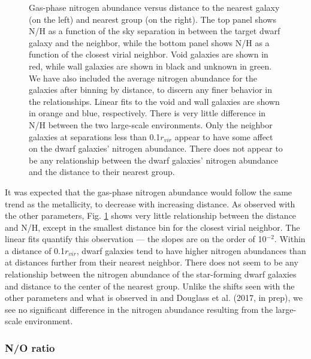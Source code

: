 \begin{figure}
    \caption[N/H versus distance to nearest neighbor and group]{Gas-phase 
    nitrogen abundance versus distance to the nearest galaxy (on the left) and 
    nearest group (on the right).  The top panel shows N/H as a function of the 
    sky separation in \hMpc between the target dwarf galaxy and the neighbor, 
    while the bottom panel shows N/H as a function of the closest virial 
    neighbor.  Void galaxies are shown in red, while wall galaxies are shown in 
    black and unknown in green.  We have also included the average nitrogen 
    abundance for the galaxies after binning by distance, to discern any finer 
    behavior in the relationships.  Linear fits to the void and wall galaxies 
    are shown in orange and blue, respectively.  There is very little difference 
    in N/H between the two large-scale environments.  Only the neighbor galaxies 
    at separations less than 0.1$r_{vir}$ appear to have some affect on the 
    dwarf galaxies' nitrogen abundance.  There does not appear to be any 
    relationship between the dwarf galaxies' nitrogen abundance and the distance 
    to their nearest group.}
    \label{fig:NH}
\end{figure}

It was expected that the gas-phase nitrogen abundance would follow the same 
trend as the metallicity, to decrease with increasing distance.  As observed 
with the other parameters, Fig. \ref{fig:NH} shows very little relationship 
between the distance and N/H, except in the smallest distance bin for the 
closest virial neighbor.  The linear fits quantify this observation --- the 
slopes are on the order of 10$^{-2}$.  Within a distance of 0.1$r_{vir}$, dwarf 
galaxies tend to have higher nitrogen abundances than at distances further from 
their nearest neighbor.  There does not seem to be any relationship between the 
nitrogen abundance of the star-forming dwarf galaxies and distance to the center 
of the nearest group.  Unlike the shifts seen with the other parameters and what 
is observed in \cite{Douglass17b} and Douglass et al. (2017, in prep), we see no 
significant difference in the nitrogen abundance resulting from the large-scale 
environment.


\subsubsection{N/O ratio}

